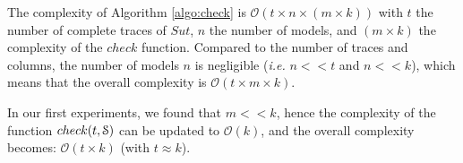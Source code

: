 The complexity of Algorithm \ref{algo:check} is $\mathcal{O}(t
\times n \times (m \times k))$ with $t$ the number of complete
traces of $\mathit{Sut}$, $n$ the number of models, and $(m
\times k)$ the complexity of the $check$ function.  Compared to
the number of traces and columns, the number of models $n$ is
negligible (\emph{i.e.} $n << t$ and $n << k$), which means that
the overall complexity is $\mathcal{O}(t \times m \times k)$.

In our first experiments, we found that $m << k$, hence the
complexity of the function $check(t, \EuScript{S})$ can be
updated to $\mathcal{O}(k)$, and the overall complexity
becomes: $\mathcal{O}(t \times k)$ (with $t \approx k$).

\clearpage
